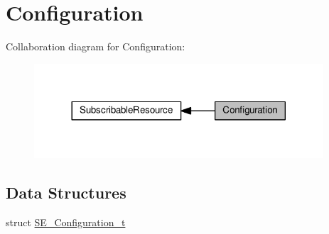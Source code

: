 \hypertarget{group__Configuration}{}\section{Configuration}
\label{group__Configuration}
Collaboration diagram for Configuration\+:\nopagebreak
\begin{figure}[H]
\begin{center}
\leavevmode
\includegraphics[width=305pt]{group__Configuration}
\end{center}
\end{figure}
\subsection*{Data Structures}
\begin{DoxyCompactItemize}
\item 
struct \hyperlink{structSE__Configuration__t}{S\+E\+\_\+\+Configuration\+\_\+t}
\end{DoxyCompactItemize}
